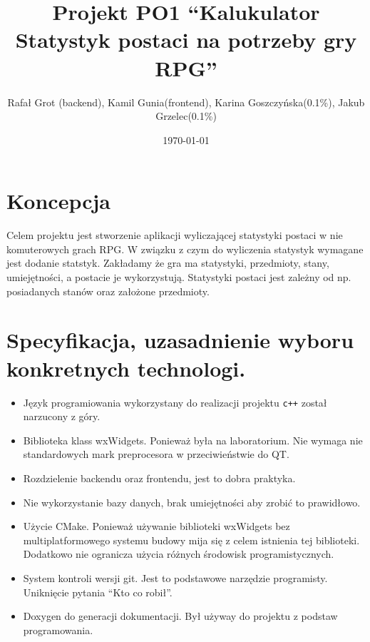 \documentclass[11pt]{article}
\author{Rafał Grot (backend), Kamil Gunia(frontend), Karina Goszczyńska(0.1\%), Jakub Grzelec(0.1\%)}
\date{\today}
\title{Projekt PO1 ``Kalukulator Statystyk postaci na potrzeby gry RPG''}
\begin{document}
\maketitle
\newpage

\section{Koncepcja}
\label{sec:orgf386dec}
Celem projektu jest stworzenie aplikacji wyliczającej statystyki postaci w nie komuterowych grach RPG.
W związku z czym do wyliczenia statystyk wymagane jest dodanie statstyk.
Zakładamy że gra ma statystyki, przedmioty, stany, umiejętności, a postacie je wykorzystują.
Statystyki postaci jest zależny od np. posiadanych stanów oraz założone przedmioty.
\section{Specyfikacja, uzasadnienie wyboru konkretnych technologi.}
\label{sec:org56e82e3}
\begin{itemize}
\item Język programiowania wykorzystany do realizacji projektu \texttt{c++} został narzucony z góry.
\item Biblioteka klass wxWidgets. Ponieważ była na laboratorium. Nie wymaga nie standardowych mark preprocesora w przeciwieństwie do QT.
\item Rozdzielenie backendu oraz frontendu, jest to dobra praktyka.
\item Nie wykorzystanie bazy danych, brak umiejętności aby zrobić to prawidłowo.
\item Użycie CMake. Ponieważ używanie biblioteki wxWidgets bez multiplatformowego systemu budowy mija się z celem istnienia tej biblioteki. Dodatkowo nie ogranicza użycia różnych środowisk programistycznych.
\item System kontroli wersji git. Jest to podstawowe narzędzie programisty. Uniknięcie pytania ``Kto co robił''.
\item Doxygen do generacji dokumentacji. Był używay do projektu z podstaw programowania.
\end{itemize}
\end{document}
